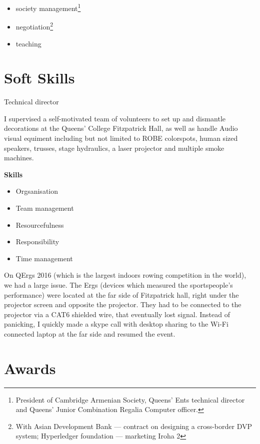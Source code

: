 \documentclass{CurriculumVitae}[10pt, condensed]
\begin{document}
\begin{multicols}{4}
\begin{itemize}[topsep=0pt]
\begin{itemize}[topsep=0pt, partopsep=0pt]
      \setlength{\itemsep}{-0.3em}
    \item society management\footnote{President of Cambridge Armenian
        Society, Queens' Ents technical director and Queens' Junior
        Combination Regalia Computer officer. }
    \item negotiation\footnote{With Asian Development Bank ---
        contract on designing a cross-border DVP system; Hyperledger
        foundation ---  marketing Iroha 2}
    \item teaching
    \end{itemize}
  \end{itemize}

\end{multicols}

\section*{Soft Skills}

 {Technical director} {I supervised a
  self-motivated team of volunteers to set up and dismantle
  decorations at the Queens' College Fitzpatrick Hall, as well as
  handle Audio visual equiment including but not limited to ROBE
  colorspots, human sized speakers, trusses, stage hydraulics, a laser
  projector and multiple smoke machines. 

\textbf{Skills}
\begin{itemize}
\item Orgsanisation
\item Team management
\item Resourcefulness
\item Responsibility
\item Time management
\end{itemize}

On QErgs 2016 (which is the largest indoors rowing competition in the
world), we had a large issue. The Ergs (devices which measured the
sportspeople's performance) were located at the far side of
Fitzpatrick hall, right under the projector screen and opposite the
projector. They had to be connected to the projector via a CAT6
shielded wire, that eventually lost signal. Instead of panicking, I
quickly made a skype call with desktop sharing to the Wi-Fi connected
laptop at the far side and resumed the event. }
\section*{Awards}
\end{document}
